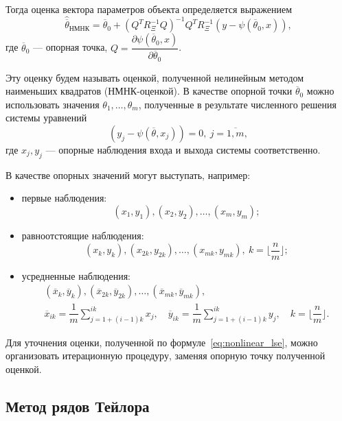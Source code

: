 Тогда оценка вектора параметров объекта определяется выражением~\cite{mukha_2009}
\begin{equation}
  \label{eq:nonlinear_lse}
  \hat{\overline{\theta}}_{\text{НМНК}} =
  \overline{\theta}_0 + (Q^T R^{-1}_{\Xi} Q)^{-1} Q^T R^{-1}_{\Xi} (y - \psi(\overline{\theta}_0, x)),
\end{equation}
где \( \overline{\theta}_0 \) --- опорная точка,
\( Q = \dfrac{\partial \psi(\overline{\theta}_0, x) }{ \partial \overline{\theta}_0 } \).

Эту оценку будем называть оценкой, полученной нелинейным
методом наименьших квадратов (НМНК-оценкой).
В качестве опорной точки \( \overline{\theta}_0 \) можно использовать значения
\( \theta_1, \dotsc, \theta_m \),
полученные в результате численного решения системы уравнений
\begin{equation}
  \label{eq:nonlinear_basic}
  (y_j - \psi( \overline{\theta}, x_j )) = 0, \: j = \overline{1,m},
\end{equation}
где \( x_j, y_j \) --- опорные наблюдения входа и выхода системы соответственно.

В качестве опорных значений могут выступать, например:
\begin{itemize}
\item первые наблюдения:
  \[ (x_1, y_1), (x_2, y_2), \dotsc , (x_m, y_m); \]
\item равноотстоящие наблюдения:
  \[
    (x_{k}, y_{k}), (x_{2k}, y_{2k}) , \dotsc , (x_{mk}, y_{mk}), \:
    k = \lfloor \dfrac{n}{m} \rfloor;
  \]
\item усредненные наблюдения:
  \begin{gather*}
    ( \overline{x}_{k}, \overline{y}_{k} ),
    ( \overline{x}_{2k}, \overline{y}_{2k} ),
    \dotsc ,
    ( \overline{x}_{mk}, \overline{y}_{mk}), \\
    \overline{x}_{ik} = \dfrac{1}{m} \sum_{j = 1+(i-1)k}^{ik} x_j, \quad
    \overline{y}_{ik} = \dfrac{1}{m} \sum_{j = 1+(i-1)k}^{ik} y_j, \quad
    k = \lfloor \dfrac{n}{m} \rfloor.
  \end{gather*}
\end{itemize}

Для уточнения оценки, полученной по формуле~\eqref{eq:nonlinear_lse}, можно
организовать итерационную процедуру, заменяя опорную точку полученной оценкой.

\vspace{2\baselineskip}
\subsection{Метод рядов Тейлора}

